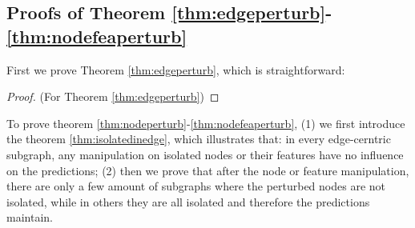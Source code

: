 \subsection{Proofs of Theorem \ref{thm:edgeperturb}-\ref{thm:nodefeaperturb}}
\label{proof:edgepart}
First we prove Theorem \ref{thm:edgeperturb}, which is straightforward:
\begin{proof}(For Theorem \ref{thm:edgeperturb})
    
\end{proof}

To prove theorem \ref{thm:nodeperturb}-\ref{thm:nodefeaperturb}, (1) we first introduce the theorem \ref{thm:isolatedinedge}, which illustrates that: in every edge-cerntric subgraph, any manipulation on isolated nodes or their features have no influence on the predictions; (2) then we prove that after the node or feature manipulation, there are only a few amount of subgraphs where the perturbed nodes are not isolated, while in others they are all isolated and therefore the predictions maintain.

